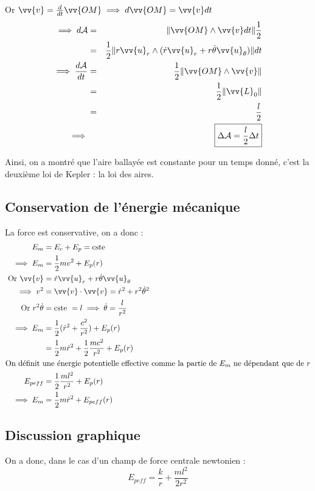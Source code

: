 Or \(\vv{v} = \frac{d}{dt}\vv{OM} \implies d\vv{OM} = \vv{v}dt\)
\begin{eqnarray*}
    \implies d \mathcal{A} &=& \lVert \vv{OM} \wedge \vv{v}dt \rVert \frac{1}{2} \\
    &=& \frac{1}{2}\lVert r\vv{u}_{r} \wedge (\dot{r}\vv{u}_{r} + r \dot{\theta}\vv{u}_{\theta}) \rVert dt \\
    \implies \frac{d \mathcal{A}}{dt} &=& \frac{1}{2} \lVert \vv{OM} \wedge \vv{v} \rVert \\
    &=& \frac{1}{2}\lVert \vv{L}_{0} \rVert \\
    &=& \frac{l}{2}\\
    \implies && \boxed{\Delta \mathcal{A} = \frac{l}{2}\Delta t} 
\end{eqnarray*}

Ainsi, on a montré que l'aire ballayée est constante pour un temps donné, c'est la deuxième loi de Kepler : la loi des aires.

\subsection{Conservation de l'énergie mécanique}

La force est conservative, on a donc : 
\begin{align*}
    E_{m} &= E_{c} + E_{p}  = \text{cste } \\
    \implies E_{m} &= \frac{1}{2}mv^{2} + E_{p}(r) \\
    \text{ Or } \vv{v} &=  \dot{r}\vv{u}_{r} + r\dot{\theta} \vv{u}_{\theta} \\
    \implies v^{2} &= \vv{v} \cdot \vv{v} = \dot{r}^{2} + r^{2} \dot{\theta}^{2} \\
    \text{ Or } r^{2}\dot{\theta} &= \text{cste } = l \implies \dot{\theta} = \frac{l}{r^{2}} \\
    \implies E_{m} &= \frac{1}{2} (\dot{r}^{2} + \frac{c^{2}}{r^{2}}) + E_{p}(r) \\
    &= \frac{1}{2} m\dot{r}^{2} + \frac{1}{2}\frac{mc^{2}}{r^{2}} + E_{p}(r) \\
    \intertext{On définit une énergie potentielle effective comme la partie de \(E_{m}\) ne dépendant que de \(r\)}
    E_{peff} &= \frac{1}{2} \frac{ml^{2}}{r^{2}} + E_{p}(r)\\
    \implies E_{m} &= \frac{1}{2} m\dot{r}^{2} + E_{peff}(r)
\end{align*}

\subsection{Discussion graphique}
On a donc, dans le cas d'un champ de force centrale newtonien :
\[
    E_{peff} = \frac{k}{r} + \frac{ml^{2}}{2r^{2}}
\]

